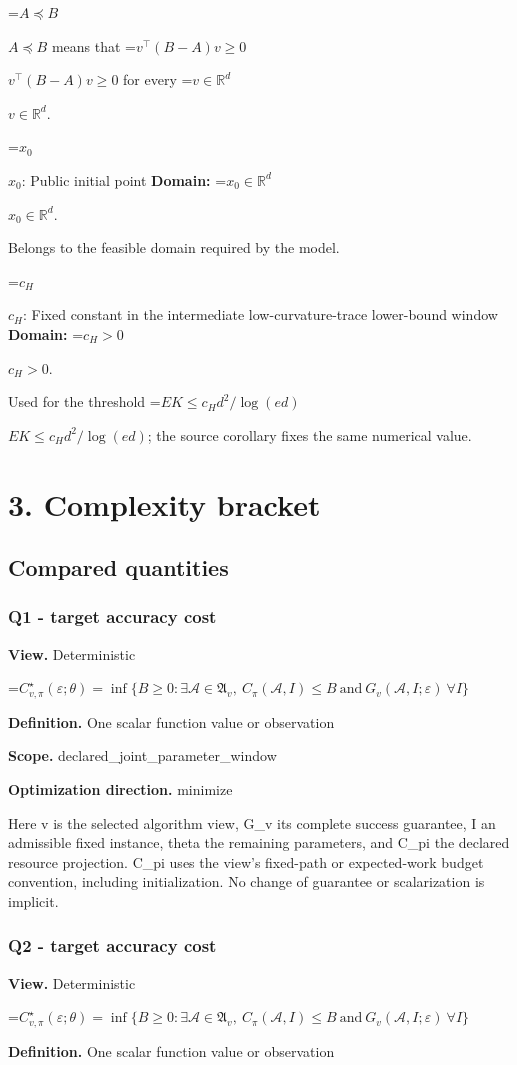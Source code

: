 \documentclass[10pt,a4paper]{article}
\newcommand{\AtlasMath}[1]{\par\begingroup\centering\setbox0=\hbox{$\displaystyle #1$}\ifdim\wd0>1.4\linewidth\typeout{ATLAS WIDE FORMULA: \the\wd0}\fi\ifdim\wd0>\linewidth\resizebox{\linewidth}{!}{\box0}\else\box0\fi\par\endgroup}
\newcommand{\AtlasInlineMath}[1]{\begingroup\setbox0=\hbox{$#1$}\ifdim\wd0>.4\linewidth\endgroup\AtlasMath{#1}\else\endgroup$#1$\fi}
\begin{document}
\AtlasInlineMath{A\preceq B} means that \AtlasInlineMath{v^\top(B-A)v\ge0} for every \AtlasInlineMath{v\in\mathbb{R}^d}.

\AtlasInlineMath{x_0}: Public initial point \textbf{Domain:} \AtlasInlineMath{x_0\in\mathbb{R}^d}.

Belongs to the feasible domain required by the model.

\AtlasInlineMath{c_H}: Fixed constant in the intermediate low-curvature-trace lower-bound window \textbf{Domain:} \AtlasInlineMath{c_H>0}.

Used for the threshold \AtlasInlineMath{EK\le c_Hd^2/\log(ed)}; the source corollary fixes the same numerical value.

\section{3. Complexity bracket}
\subsection{Compared quantities}
\subsubsection{Q1 - target accuracy cost}
\textbf{View.} Deterministic

\AtlasMath{C^\star_{v,\pi}(\varepsilon;\theta)=\inf\{B\ge0:\exists\mathcal A\in\mathfrak A_v,\ C_\pi(\mathcal A,I)\le B\ \text{and}\ G_v(\mathcal A,I;\varepsilon)\ \forall I\}}
\textbf{Definition.} One scalar function value or observation

\textbf{Scope.} declared\_joint\_parameter\_window

\textbf{Optimization direction.} minimize

Here v is the selected algorithm view, G\_v its complete success guarantee, I an admissible fixed instance, theta the remaining parameters, and C\_pi the declared resource projection. C\_pi uses the view's fixed-path or expected-work budget convention, including initialization. No change of guarantee or scalarization is implicit.

\subsubsection{Q2 - target accuracy cost}
\textbf{View.} Deterministic

\AtlasMath{C^\star_{v,\pi}(\varepsilon;\theta)=\inf\{B\ge0:\exists\mathcal A\in\mathfrak A_v,\ C_\pi(\mathcal A,I)\le B\ \text{and}\ G_v(\mathcal A,I;\varepsilon)\ \forall I\}}
\textbf{Definition.} One scalar function value or observation
\end{document}
